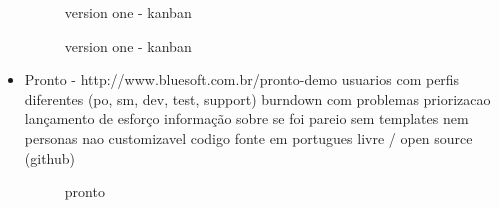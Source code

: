 \begin{itemize}
\begin{figure}[H]
  \centering
  \caption{version one - kanban}
\end{figure}

\begin{figure}[H]
  \centering
  \caption{version one - kanban}
\end{figure}

\item Pronto - http://www.bluesoft.com.br/pronto-demo
usuarios com perfis diferentes (po, sm, dev, test, support)
burndown com problemas
priorizacao
lançamento de esforço
informação sobre se foi pareio
sem templates nem personas
nao customizavel
codigo fonte em portugues
livre / open source (github)

\begin{figure}[H]
  \centering
  \caption{pronto}
\end{figure}


\end{itemize}
